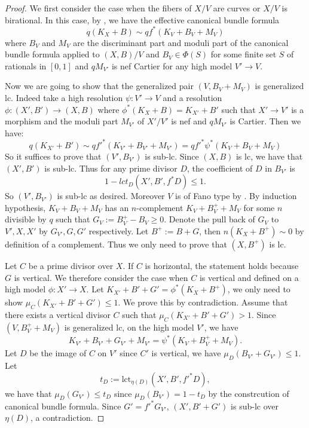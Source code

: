 \documentclass[letterpaper,reqno,12pt]{amsart}
\numberwithin{equation}{section}
\theoremstyle{plain}
\begin{document}
\begin{proof}
    We first consider the case when the fibers of $X/V$ are curves or $X/V$ is birational. In this case, by , we have the effective canonical bundle formula 
    \[q(K_X+B)\sim qf^*(K_V+B_V+M_V)\]
    where $B_V$ and $M_V$ are the discriminant part and moduli part of the canonical bundle formula applied to $(X,B)/V$ and $B_V\in\Phi( S)$ for some finite set $ S$ of rationals in $[0,1]$ and $qM_{V'}$ is nef Cartier for any high model $V'\to V$.

    Now we are going to show that the generalized pair $(V,B_V+M_V)$  is generalized lc. Indeed take a high resolution $\psi:V'\to V$ and a resolution $\phi:(X',B')\to (X,B)$ where $\phi^*(K_X+B)=K_{X'}+B'$ such that $X'\to V'$ is a morphism and the moduli part $M_{V'}$ of $X'/V'$ is nef and $qM_{V'}$ is Cartier. Then we have:
    \[q(K_{X'}+B')\sim qf'^*(K_{V'}+B_{V'}+M_{V'})=qf'^*\psi^*(K_V+B_V+M_V)\]
    So it suffices to prove that $(V',B_{V'})$ is sub-lc. Since $(X,B)$ is lc, we have that $(X',B')$ is sub-lc. Thus for any prime divisor $D$, the coefficient of $D$ in $B_{V'}$ is \[1-lct_D(X',B',f^*D)\leq 1.\] So $(V',B_{V'})$ is sub-lc as desired. Moreover $V$ is of Fano type by . By induction hypothesis, $K_V+B_V+M_V$ has an $n$-complement $K_V+B^+_V+M_V$ for some $n$ divisible by $q$ such that $G_V:=B^+_V-B_V\geq0$. Denote the pull back of $G_V$ to $V',X,X'$ by $G_{V'},G,G'$ respectively. Let $B^+:=B+G$, then $n(K_X+B^+)\sim 0$ by definition of a complement. Thus we only need to prove that $(X,B^+)$ is lc.

    Let $C$ be a prime divisor over $X$. If $C$ is horizontal, the statement holds because $G$ is vertical. We therefore consider the case when $C$ is vertical and defined on a high model $\phi:X'\to X$. Let $K_{X'}+B'+G'=\phi^*(K_X+B^+)$, we only need to show $\mu_C(K_{X'}+B'+G')\leq 1$. We prove this by contradiction. Assume that there exists a vertical divisor $C$ such that $\mu_C(K_{X'}+B'+G')>1$. Since $(V,B_V^++M_V)$ is generalized lc, on the high model $V'$, we have
    \[K_{V'}+B_{V'}+G_{V'}+M_{V'}=\psi^*(K_V+B^+_V+M_V).\]
    Let $D$ be the image of $C$ on $V'$ since $C'$ is vertical, we have $\mu_D(B_{V'}+G_{V'})\leq 1$. Let \[t_D:=\text{lct}_{\eta(D)}(X',B',f'^*D),\] we have that $\mu_D(G_{V'})\leq t_D$ since $\mu_D(B_{V'})=1-t_D$ by the constrcution of canonical bundle formula. Since $G'=f'^*G_{V'}$, $(X',B'+G')$ is sub-lc over $\eta(D)$, a contradiction.


\end{proof}
\end{document}
